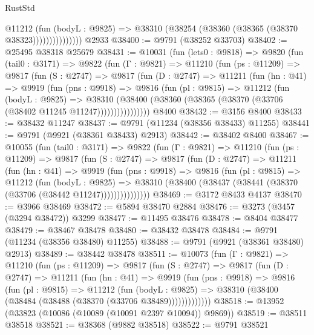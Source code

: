 \begin{lexlean}{RustStd}
\begin{coremodule}
                      @11212
                        (fun (bodyL : @9825) =>
                        @38310 (@38254 (@38360 (@38365 (@38370 @38323)))))))))))))))
    @2933
@38400 := @9791 (@38252 @33703)
@38402 := @25495 @38318 @25679
@38431 := @10031
    (fun (lets0 : @9818) =>
    @9820
      (fun (tail0 : @3171) =>
      @9822
        (fun (Γ : @9821) =>
        @11210
          (fun (ps : @11209) =>
          @9817
            (fun (S : @2747) =>
            @9817
              (fun (D : @2747) =>
              @11211
                (fun (hn : @41) =>
                @9919
                  (fun (pns : @9918) =>
                  @9816
                    (fun (pl : @9815) =>
                    @11212
                      (fun (bodyL : @9825) =>
                      @38310
                        (@38400
                          (@38360 (@38365 (@38370 (@33706 (@38402 @11245 @11247))))))))))))))))
    @8400
@38432 := @3156 @8400
@38433 := @38432 @11247
@38437 := @9791 (@11234 (@38356 @38433) @11255)
@38441 := @9791 (@9921 (@38361 @38433) @2913)
@38442 := @38402 @8400
@38467 := @10055
    (fun (tail0 : @3171) =>
    @9822
      (fun (Γ : @9821) =>
      @11210
        (fun (ps : @11209) =>
        @9817
          (fun (S : @2747) =>
          @9817
            (fun (D : @2747) =>
            @11211
              (fun (hn : @41) =>
              @9919
                (fun (pns : @9918) =>
                @9816
                  (fun (pl : @9815) =>
                  @11212
                    (fun (bodyL : @9825) =>
                    @38310 (@38400 (@38437 (@38441 (@38370 (@33706 (@38442 @11247)))))))))))))))
@38469 := @3172 @8433 @4137
@38470 := @3966 @38469
@38472 := @5894 @38470 @2884
@38476 := @3273 (@3457 (@3294 @38472)) @3299
@38477 := @11495 @38476
@38478 := @8404 @38477
@38479 := @38467 @38478
@38480 := @38432 @38478
@38484 := @9791 (@11234 (@38356 @38480) @11255)
@38488 := @9791 (@9921 (@38361 @38480) @2913)
@38489 := @38442 @38478
@38511 := @10073
    (fun (Γ : @9821) =>
    @11210
      (fun (ps : @11209) =>
      @9817
        (fun (S : @2747) =>
        @9817
          (fun (D : @2747) =>
          @11211
            (fun (hn : @41) =>
            @9919
              (fun (pns : @9918) =>
              @9816
                (fun (pl : @9815) =>
                @11212
                  (fun (bodyL : @9825) =>
                  @38310 (@38400 (@38484 (@38488 (@38370 (@33706 @38489)))))))))))))
@38518 := @13952 (@33823 (@10086 (@10089 (@10091 @2397 @10094)) @9869))
@38519 := @38511 @38518
@38521 := @38368 (@9882 @38518)
@38522 := @9791 @38521

\end{coremodule}
\end{lexlean}
